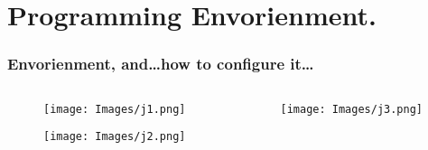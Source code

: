 \documentclass[
  11pt, %
  xcolor=dvipsnames
]{beamer}
\begin{document}
\section{Programming Envorienment.}
\begin{frame}[fragile]
	\frametitle{Envorienment, and\dots how to configure it\dots}

	\begin{columns}
		\begin{column}{0.5\textwidth}


			\begin{figure}
				\begin{center}
					\texttt{[image: Images/j1.png]}
				\end{center}
				\caption{}\label{fig:2.1}
			\end{figure}
			\bigskip %
			\begin{figure}
				\begin{center}
					\texttt{[image: Images/j2.png]}
				\end{center}
				\caption{}\label{fig:2.2}
			\end{figure}

		\end{column}
		\begin{column}{0.4\textwidth}
			\begin{figure}
				\begin{center}
					\texttt{[image: Images/j3.png]}
				\end{center}
				\caption{}\label{fig:2.3}
			\end{figure}
		\end{column}
	\end{columns}

\end{frame}
\end{document}
